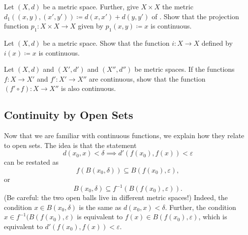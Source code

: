 \documentclass[../main.tex]{subfiles}
\begin{document}
\begin{exercise}
    Let $(X,d)$ be a metric space. Further, give $X\times X$ the metric $d_1((x,y),(x',y'))\coloneqq d(x,x')+d(y,y')$ of . Show that the projection function $p_1\colon X\times X\to X$ given by $p_1(x,y)\coloneqq x$ is continuous.
\end{exercise}
\begin{exercise} \label{exe:id-is-cont}
    Let $(X,d)$ be a metric space. Show that the function $i\colon X\to X$ defined by $i(x)\coloneqq x$ is continuous.
\end{exercise}
\begin{exercise} \label{exe:comp-is-cont}
    Let $(X,d)$ and $(X',d')$ and $(X'',d'')$ be metric spaces. If the functions $f\colon X\to X'$ and $f'\colon X'\to X''$ are continuous, show that the function $(f'\circ f)\colon X\to X''$ is also continuous.
\end{exercise}

\subsection{Continuity by Open Sets}
Now that we are familiar with continuous functions, we explain how they relate to open sets. The idea is that the statement
\[d(x_0,x)<\delta\implies d'(f(x_0),f(x))<\varepsilon\]
can be restated as
\[f(B(x_0,\delta))\subseteq B(f(x_0),\varepsilon),\]
or
\[B(x_0,\delta)\subseteq f^{-1}(B(f(x_0),\varepsilon)).\]
(Be careful: the two open balls live in different metric spaces!) Indeed, the condition $x\in B(x_0,\delta)$ is the same as $d(x_0,x)<\delta$. Further, the condition $x\in f^{-1}(B(f(x_0),\varepsilon)$ is equivalent to $f(x)\in B(f(x_0),\varepsilon)$, which is equivalent to $d'(f(x_0),f(x))<\varepsilon$.
\end{document}
